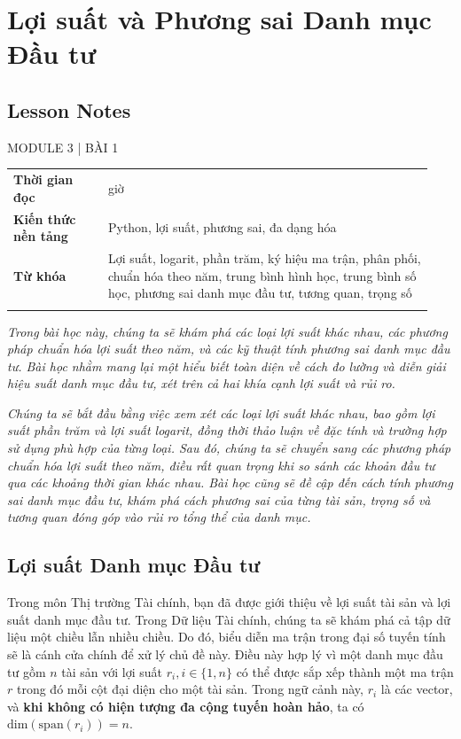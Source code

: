 \chapter{Lợi suất và Phương sai Danh mục Đầu tư}
\label{ch:M3L1}


\section*{Lesson Notes}

MODULE 3 | BÀI 1

{\small
\begin{longtable}{>{\raggedright\arraybackslash}p{0.213\linewidth}>{\raggedright\arraybackslash}p{0.727\linewidth}}
\toprule
\textbf{Thời gian đọc} & 2 giờ \\
\addlinespace[2pt]
\textbf{Kiến thức nền tảng} & Python, lợi suất, phương sai, đa dạng hóa \\
\addlinespace[2pt]
\textbf{Từ khóa} & Lợi suất, logarit, phần trăm, ký hiệu ma trận, phân phối, chuẩn hóa theo năm, trung bình hình học, trung bình số học, phương sai danh mục đầu tư, tương quan, trọng số \\
\addlinespace[2pt]
\bottomrule
\end{longtable}
}

\emph{Trong bài học này, chúng ta sẽ khám phá các loại lợi suất khác nhau, các phương pháp chuẩn hóa lợi suất theo năm, và các kỹ thuật tính phương sai danh mục đầu tư. Bài học nhằm mang lại một hiểu biết toàn diện về cách đo lường và diễn giải hiệu suất danh mục đầu tư, xét trên cả hai khía cạnh lợi suất và rủi ro.}

\emph{Chúng ta sẽ bắt đầu bằng việc xem xét các loại lợi suất khác nhau, bao gồm lợi suất phần trăm và lợi suất logarit, đồng thời thảo luận về đặc tính và trường hợp sử dụng phù hợp của từng loại. Sau đó, chúng ta sẽ chuyển sang các phương pháp chuẩn hóa lợi suất theo năm, điều rất quan trọng khi so sánh các khoản đầu tư qua các khoảng thời gian khác nhau. Bài học cũng sẽ đề cập đến cách tính phương sai danh mục đầu tư, khám phá cách phương sai của từng tài sản, trọng số và tương quan đóng góp vào rủi ro tổng thể của danh mục.}

\section{Lợi suất Danh mục Đầu tư}

Trong môn Thị trường Tài chính, bạn đã được giới thiệu về lợi suất tài sản và lợi suất danh mục đầu tư. Trong Dữ liệu Tài chính, chúng ta sẽ khám phá cả tập dữ liệu một chiều lẫn nhiều chiều. Do đó, biểu diễn ma trận trong đại số tuyến tính sẽ là cánh cửa chính để xử lý chủ đề này. Điều này hợp lý vì một danh mục đầu tư gồm $n$ tài sản với lợi suất $r_{i}, i \in \{1,n\}$ có thể được sắp xếp thành một ma trận $r$ trong đó mỗi cột đại diện cho một tài sản. Trong ngữ cảnh này, $r_{i}$ là các vector, và \textbf{khi không có hiện tượng đa cộng tuyến hoàn hảo}, ta có $\text{dim}(\text{span}(r_{i})) = n$.

